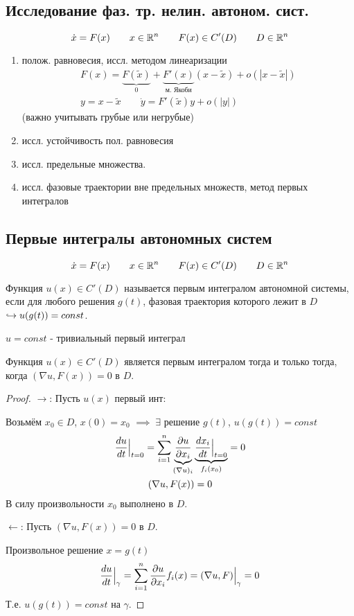 \documentclass{article}
\begin{document}
\subsection{Исследование фаз. тр. нелин. автоном. сист.}
\[
  \dot{x}=F(x) \qquad x\in \mathbb{R}^{n} \qquad F(x)\in C'(D) \qquad D\in \mathbb{R}^{n}
\]
\begin{enumerate}
  \item полож. равновесия, иссл. методом линеаризации
    \begin{gather*}
      F(x)=\underbrace{F(\tilde{x})}_{0}+\underbrace{F'(x)}_{\text{м. Якоби}}(x-\tilde{x})+o(|x-\tilde{x}|) \\ 
      y=x-\tilde{x} \qquad \dot{y}=F'(\tilde{x})y+o(|y|)
    \end{gather*}
    (важно учитывать грубые или негрубые)
  \item иссл. устойчивость пол. равновесия
  \item иссл. предельные множества.
  \item иссл. фазовые траектории вне предельных множеств, метод первых интегралов
\end{enumerate}

\subsection{Первые интегралы автономных систем}
\[
  \dot{x}=F(x) \qquad x\in \mathbb{R}^{n} \qquad F(x)\in C'(D) \qquad D\in \mathbb{R}^{n}
\]
\begin{definition}
  Функция $u(x)\in C'(D)$ называется первым интегралом автономной системы,
  если для любого решения $g(t)$, фазовая траектория которого лежит в $D$
  $\hookrightarrow u(g(t))=const$.
\end{definition}
\begin{eg}
  $u=const$ - тривиальный первый интеграл
\end{eg}
\begin{theorem}
  Функция $u(x)\in C'(D)$ является первым интегралом тогда и только тогда,
  когда $(\nabla u,F(x))=0$ в $D$.
\end{theorem}
\begin{proof}
  $\rightarrow$: Пусть $u(x)$ первый инт:

  Возьмём $x_0 \in D$, $x(0)=x_0$ $\implies \; \exists$ решение $g(t)$,
  $u(g(t))=const$
  \begin{gather*}
    \frac{du}{dt}\Big|_{t=0}=\sum_{i=1}^{n}\underbrace{\frac{\partial{u}}{\partial{x_i}}}_{(\nabla u)_{i}}\underbrace{\frac{dx_i}{dt}\Big|_{t=0}}_{f_i(x_0)}=0 \\ 
    (\nabla u, F(x))=0
  \end{gather*}
  В силу произвольности $x_0$ выполнено в $D$.

  $\leftarrow$: Пусть $(\nabla u, F(x))=0$ в $D$.

  Произвольное решение $x=g(t)$
  \begin{gather*}
    \frac{du}{dt}\Big|_{\gamma}=\sum_{i=1}^{n}\frac{\partial{u}}{\partial{x_i}}f_{i}(x)=(\nabla u, F)\Big|_{\gamma}=0
  \end{gather*}
  Т.е. $u(g(t))=const$ на $\gamma$.
\end{proof}
\end{document}
